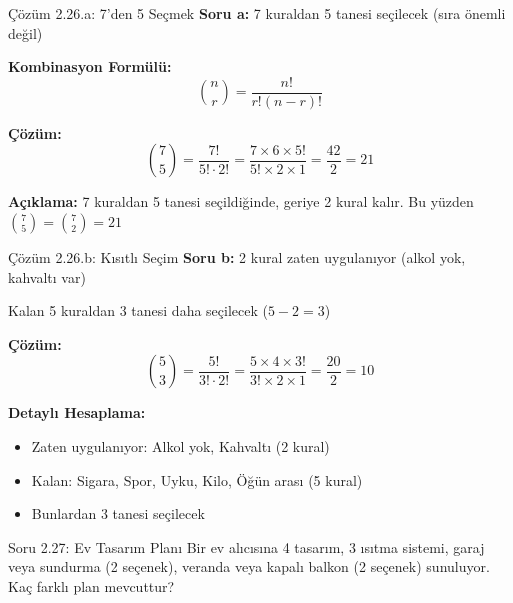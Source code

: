 \documentclass[light]{lutbeamer}
\begin{document}
\begin{frame}{Çözüm 2.26.a: 7'den 5 Seçmek}
    \color{blue}
    \textbf{Soru a:} 7 kuraldan 5 tanesi seçilecek (sıra önemli değil)
    
    \vspace{0.3cm}
    \textbf{Kombinasyon Formülü:}
    \[ \binom{n}{r} = \frac{n!}{r!(n-r)!} \]
    
    \vspace{0.3cm}
    \textbf{Çözüm:}
    \[ \binom{7}{5} = \frac{7!}{5! \cdot 2!} = \frac{7 \times 6 \times 5!}{5! \times 2 \times 1} = \frac{42}{2} = 21 \]
    
    \vspace{0.3cm}
    \textbf{Açıklama:} 7 kuraldan 5 tanesi seçildiğinde, geriye 2 kural kalır. Bu yüzden $\binom{7}{5} = \binom{7}{2} = 21$
    
    \begin{center}
    \end{center}
\end{frame}

\begin{frame}{Çözüm 2.26.b: Kısıtlı Seçim}
    \color{blue}
    \textbf{Soru b:} 2 kural zaten uygulanıyor (alkol yok, kahvaltı var)
    
    Kalan 5 kuraldan 3 tanesi daha seçilecek ($5 - 2 = 3$)
    
    \vspace{0.3cm}
    \textbf{Çözüm:}
    \[ \binom{5}{3} = \frac{5!}{3! \cdot 2!} = \frac{5 \times 4 \times 3!}{3! \times 2 \times 1} = \frac{20}{2} = 10 \]
    
    \vspace{0.3cm}
    \textbf{Detaylı Hesaplama:}
    \begin{itemize}
        \item Zaten uygulanıyor: Alkol yok, Kahvaltı (2 kural)
        \item Kalan: Sigara, Spor, Uyku, Kilo, Öğün arası (5 kural)
        \item Bunlardan 3 tanesi seçilecek
    \end{itemize}
    
    \begin{center}
    \end{center}
\end{frame}

\begin{frame}{Soru 2.27: Ev Tasarım Planı}
    Bir ev alıcısına 4 tasarım, 3 ısıtma sistemi, garaj veya sundurma (2 seçenek), veranda veya kapalı balkon (2 seçenek) sunuluyor. Kaç farklı plan mevcuttur?
\end{frame}
\end{document}

